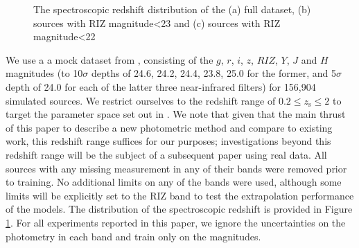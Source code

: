 \documentclass[useAMS,usenatbib,fleqn]{mn2e}
\begin{document}
\begin{figure}
       \caption{The spectroscopic redshift distribution of the (a) full dataset, (b) sources with RIZ magnitude\textless23 and (c) sources with RIZ magnitude\textless22}
	 \label{fig-zspec-histogram}
\end{figure}

We use a a mock dataset from \citet{jouvel09}, consisting of the $g$, $r$, $i$, $z$, $RIZ$, $Y$, $J$ and $H$ magnitudes (to 10$\sigma$ depths of 24.6, 24.2, 24.4, 23.8, 25.0 for the former, and 5$\sigma$ depth of 24.0 for each of the latter three near-infrared filters) for 156,904 simulated sources. We restrict ourselves to the redshift range of $0.2 \le z_\textrm{s} \le 2$ to target the parameter space set out in \cite{laureijs2011}. We note that given that the main thrust of this paper to describe a new photometric method and compare to existing work, this redshift range suffices for our purposes; investigations beyond this redshift range will be the subject of a subsequent paper using real data.
All sources with any missing measurement in any of their bands were removed prior to training. No additional limits on any of the bands were used, although some limits will be explicitly set to the RIZ band to test the extrapolation performance of the models. The distribution of the spectroscopic redshift is provided in Figure \ref{fig-zspec-histogram}. For all experiments reported in this paper, we ignore the uncertainties on the photometry in each band and train only on the magnitudes. 
\end{document}
